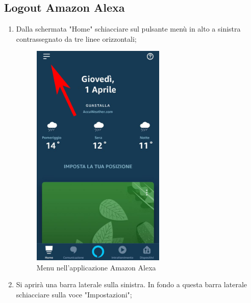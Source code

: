 \subsection{Logout Amazon Alexa}
\begin{enumerate}
\item Dalla schermata  "Home" schiacciare sul pulsante menù in alto a sinistra contrassegnato da tre linee orizzontali;

\begin{figure}[H]
	\centering
	\includegraphics[width=0.6\textwidth]{images/MenuAlexa.png}
	\caption{Menu nell'applicazione Amazon Alexa}
\end{figure}

\newpage
\item Si aprirà una barra laterale sulla sinistra. In fondo a questa barra laterale schiacciare sulla voce "Impostazioni";


\end{enumerate}
